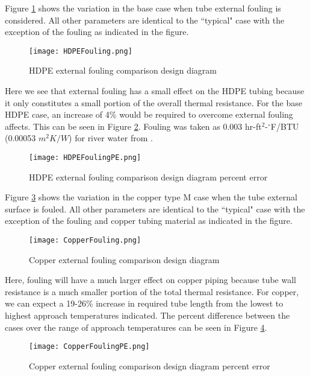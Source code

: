 Figure \ref{fig:DesignTools:SpcCooling:HDPEFouling} shows the variation in the base case when tube external fouling is considered. All other parameters are identical to the ``typical" case with the exception of the fouling as indicated in the figure.

	\begin{figure}
		\centering
		\texttt{[image: HDPEFouling.png]}
		\caption{HDPE external fouling comparison design diagram}
		\label{fig:DesignTools:SpcCooling:HDPEFouling}
	\end{figure}
	
Here we see that external fouling has a small effect on the HDPE tubing because it only constitutes a small portion of the overall thermal resistance. For the base HDPE case, an increase of 4\% would be required to overcome external fouling affects. This can be seen in Figure \ref{fig:DesignTools:SpcCooling:HDPEFoulingPE}. Fouling was taken as 0.003 hr-ft$^2$-$^\circ$F/BTU (0.00053 $m^2K/W$) for river water from \cite{Chenoweth1990}.

	\begin{figure}
		\centering
		\texttt{[image: HDPEFoulingPE.png]}
		\caption{HDPE external fouling comparison design diagram percent error}
		\label{fig:DesignTools:SpcCooling:HDPEFoulingPE}
	\end{figure}

Figure \ref{fig:DesignTools:SpcCooling:CopperFouling} shows the variation in the copper type M case when the tube external surface is fouled. All other parameters are identical to the ``typical" case with the exception of the fouling and copper tubing material as indicated in the figure.

	\begin{figure}
		\centering
		\texttt{[image: CopperFouling.png]}
		\caption{Copper external fouling comparison design diagram}
		\label{fig:DesignTools:SpcCooling:CopperFouling}
	\end{figure}
	
Here, fouling will have a much larger effect on copper piping because tube wall resistance is a much smaller portion of the total thermal resistance. For copper, we can expect a 19-26\% increase in required tube length from the lowest to highest approach temperatures indicated. The percent difference between the cases over the range of approach temperatures can be seen in Figure \ref{fig:DesignTools:SpcCooling:CopperFoulingPE}.

	\begin{figure}
		\centering
		\texttt{[image: CopperFoulingPE.png]}
		\caption{Copper external fouling comparison design diagram percent error}
		\label{fig:DesignTools:SpcCooling:CopperFoulingPE}
	\end{figure}

